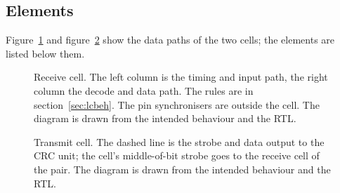\documentclass[10pt,a4paper]{article}
\begin{document}
\subsection{Elements}

Figure~\ref{fig:rx} and figure~\ref{fig:tx} show the data paths of the two cells; the elements are listed below them.

\begin{figure}[!htb]
\centering
\resizebox{\textwidth}{!}{}
\caption{Receive cell. The left column is the timing and input path, the right column the decode and data path.
The rules are in section~\ref{sec:lcbeh}. The pin synchronisers are outside the cell. The diagram is drawn
from the intended behaviour and the RTL.}
\label{fig:rx}
\end{figure}

\begin{figure}[!htb]
\centering
\resizebox{\textwidth}{!}{}
\caption{Transmit cell. The dashed line is the strobe and data output to the CRC unit; the cell's middle-of-bit
strobe goes to the receive cell of the pair. The diagram is drawn from the intended behaviour and the RTL.}
\label{fig:tx}
\end{figure}
\end{document}

